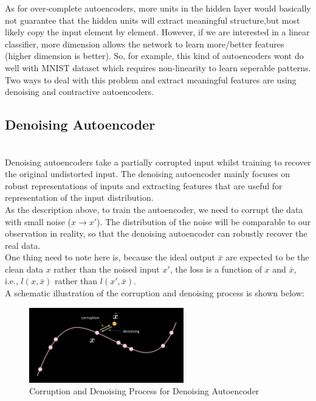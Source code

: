 As for over-complete autoencoders, more units in the hidden layer would basically not guarantee that the hidden units will extract meaningful structure,but most likely copy the input element by element. However, if we are interested in a linear classifier, more dimension allows the network to learn more/better features (higher dimension is better). So, for example, this kind of autoencoders wont do well with MNIST dataset which requires non-linearity to learn seperable patterns. Two ways to deal with this problem and extract meaningful features are using denoising and contractive autoencoders.
\\
\subsection{Denoising Autoencoder}
\\
Denoising autoencoders take a partially corrupted input whilst training to recover the original undistorted input. The denoising autoencoder mainly focuses on robust representations of inputs and extracting features that are useful for representation of the input distribution.
\\
As the description above, to train the autoencoder, we need to corrupt the data with small noise ($x \rightarrow x'$). The distribution of the noise will be comparable to our observation in reality, so that the denoising autoencoder can robustly recover the real data.
\\One thing need to note here is, because the ideal output $\bar{x}$ are expected to be the clean data $x$ rather than the noised input $x'$, the loss is a function of $x$ and $\bar{x}$, i.e., $l(x,\bar{x})$ rather than $l(x',\bar{x})$.
\\
A schematic illustration of the corruption and denoising process is shown below:
\\
\begin{figure}[htb]
    \centering
    \includegraphics[width=0.6\textwidth]{labs/10/images/Corrpution_and_Denoising.png}
    \caption{Corruption and Denoising Process for Denoising Autoencoder}
    \label{fig:Corrpution_and_Denoising}
\end{figure}

